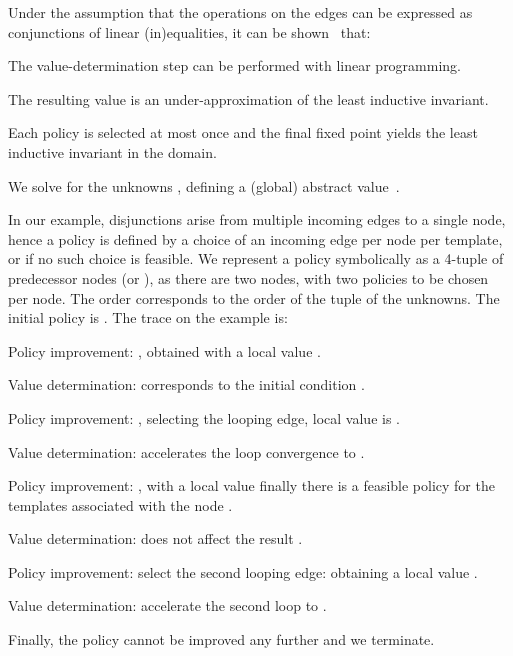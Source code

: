 \documentclass{llncs}
\begin{document}
Under the
assumption that the operations on the edges can be expressed as conjunctions of
linear (in)equalities,
it can be shown~\cite{max_strategy_templates} that:
\begin{inparaenum}[(i)]
\item The value-determination step can be performed with linear programming.
\item The resulting value is an under-approximation of the least inductive
    invariant.
\item Each policy is selected at most once and
    the final fixed point yields the least inductive invariant in the domain.
\end{inparaenum}

\begin{example}
We solve for the unknowns , defining a (global) abstract value~.

In our example, disjunctions arise from multiple
incoming edges to a single node, hence a policy is defined by a choice of an incoming
edge per node per template, or  if no such choice is feasible.
We represent a policy symbolically as a 4-tuple of predecessor nodes (or ),
as there are two nodes, with two policies to be chosen per node.
The order corresponds to the order of the tuple of the unknowns.
The initial policy  is .
The trace on the example is:
    \begin{compactenum}
        \item Policy improvement: , obtained with a
            local value .
        \item Value determination: corresponds to the initial condition 
            .
        \item Policy improvement: , selecting the
            looping edge, local value is .
        \item Value determination: accelerates the loop convergence to
            .
        \item Policy improvement: , with a local value  finally there is a
            feasible policy for the templates associated with the node .
        \item Value determination: does not affect the result .
        \item Policy improvement: select the second looping edge:  obtaining a local value .
        \item Value determination: accelerate the second loop to .
        \item Finally, the policy cannot be improved any further and we terminate.
    \end{compactenum}


\end{example}
\end{document}
